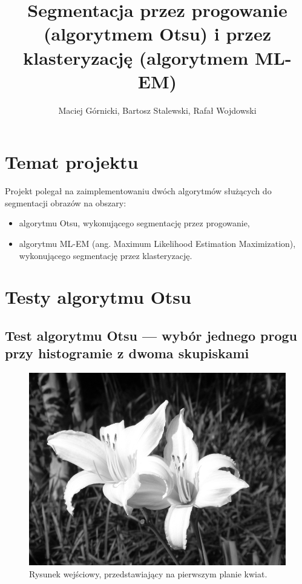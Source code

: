 \documentclass[10pt]{llncs}
\begin{document}
	
\title{Segmentacja przez progowanie (algorytmem Otsu) i przez klasteryzację (algorytmem ML-EM)}
\author{Maciej Górnicki, Bartosz Stalewski, Rafał Wojdowski}
\maketitle

\section{Temat projektu}

Projekt polegał na zaimplementowaniu dwóch algorytmów służących do segmentacji obrazów na obszary:
\begin{itemize}
	\item algorytmu Otsu, wykonującego segmentację przez progowanie,
	\item algorytmu ML-EM (ang. Maximum Likelihood Estimation Maximization), wykonującego segmentację przez klasteryzację. 
\end{itemize}

\section{Testy algorytmu Otsu}

\subsection{Test algorytmu Otsu --- wybór jednego progu przy histogramie z dwoma skupiskami}

\FloatBarrier

\begin{figure}[h!]
  \centering
  \includegraphics[scale=.3, clip]{img/01.jpg}
	\caption[]
  {Rysunek wejściowy, przedstawiający na pierwszym planie kwiat.}
\end{figure}
\end{document}

